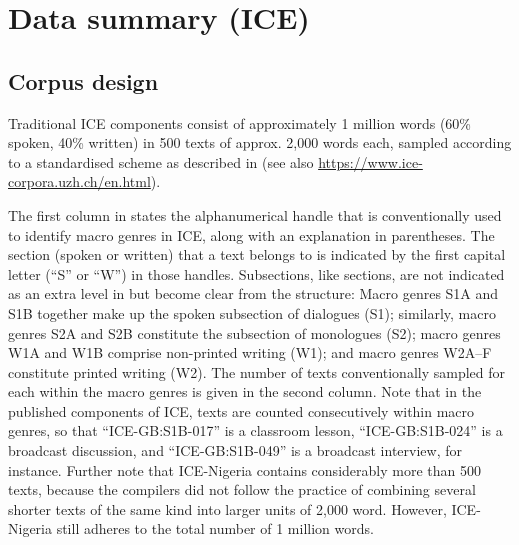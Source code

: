 \chapter{Data summary (ICE)}\label{appendix:A}

\section{Corpus design}\label{appendix:A.1}\label{bkm:Ref36971356}

Traditional ICE components consist of approximately 1 million words (60\% spoken, 40\% written) in 500 texts of approx. 2,000 words each, sampled according to a standardised scheme as described in  (see also \url{https://www.ice-corpora.uzh.ch/en.html}).

The first column in  states the alphanumerical handle that is conventionally used to identify macro genres in ICE, along with an explanation in parentheses. The section (spoken or written) that a text belongs to is indicated by the first capital letter (“S” or “W”) in those handles. Subsections, like sections, are not indicated as an extra level in  but become clear from the structure: Macro genres S1A and S1B together make up the spoken subsection of dialogues (S1); similarly, macro genres S2A and S2B constitute the subsection of monologues (S2); macro genres W1A and W1B comprise non-printed writing (W1); and macro genres W2A–F constitute printed writing (W2). The number of texts conventionally sampled for each  within the macro genres is given in the second column. Note that in the published components of ICE, texts are counted consecutively within macro genres, so that “ICE-GB:S1B-017” is a classroom lesson, “ICE-GB:S1B-024” is a broadcast discussion, and “ICE-GB:S1B-049” is a broadcast interview, for instance. Further note that ICE-Nigeria contains considerably more than 500 texts, because the compilers did not follow the practice of combining several shorter texts of the same kind into larger units of 2,000 word. However, ICE-Nigeria still adheres to the total number of 1 million words.

